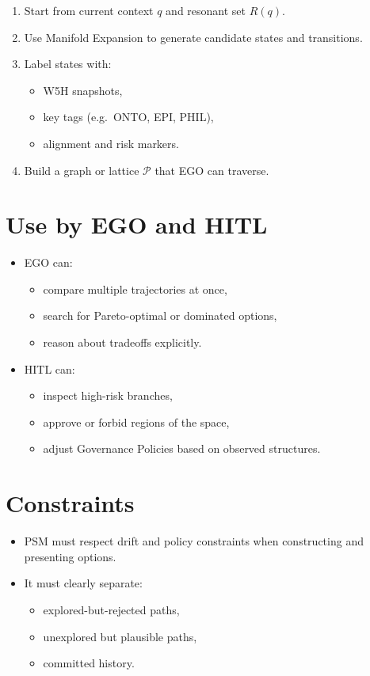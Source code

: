 \begin{enumerate}
    \item Start from current context $q$ and resonant set $R(q)$.
    \item Use Manifold Expansion to generate candidate states and
          transitions.
    \item Label states with:
          \begin{itemize}
              \item W5H snapshots,
              \item key tags (e.g.\ ONTO, EPI, PHIL),
              \item alignment and risk markers.
          \end{itemize}
    \item Build a graph or lattice $\mathcal{P}$ that EGO can traverse.
\end{enumerate}

\section{Use by EGO and HITL}

\begin{itemize}
    \item EGO can:
          \begin{itemize}
              \item compare multiple trajectories at once,
              \item search for Pareto-optimal or dominated options,
              \item reason about tradeoffs explicitly.
          \end{itemize}
    \item HITL can:
          \begin{itemize}
              \item inspect high-risk branches,
              \item approve or forbid regions of the space,
              \item adjust Governance Policies based on observed structures.
          \end{itemize}
\end{itemize}

\section{Constraints}

\begin{itemize}
    \item PSM must respect drift and policy constraints when constructing
          and presenting options.
    \item It must clearly separate:
          \begin{itemize}
              \item explored-but-rejected paths,
              \item unexplored but plausible paths,
              \item committed history.
          \end{itemize}
\end{itemize}

